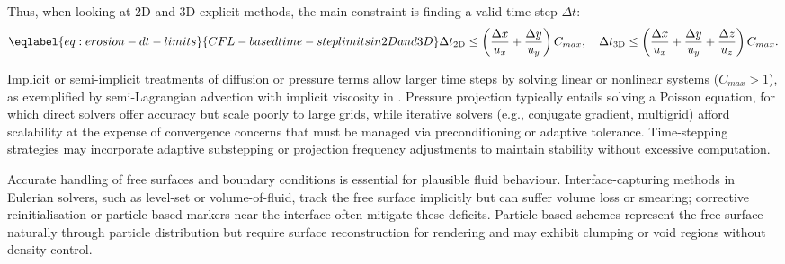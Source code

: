 
Thus, when looking at 2D and 3D explicit methods, the main constraint is finding a valid time-step $\Delta t$:
\begin{align}
    \eqlabel{eq:erosion-dt-limits}{CFL-based time-step limits in 2D and 3D}
    \Delta t_{\text{2D}} \leq \left( \frac{\Delta x}{u_x} + \frac{\Delta y}{u_y} \right) C_{max},
    \quad
    \Delta t_{\text{3D}} \leq \left( \frac{\Delta x}{u_x} + \frac{\Delta y}{u_y} + \frac{\Delta z}{u_z} \right) C_{max}.
\end{align}

Implicit or semi-implicit treatments of diffusion or pressure terms allow larger time steps by solving linear or nonlinear systems ($C_{max} > 1$), as exemplified by semi-Lagrangian advection with implicit viscosity in \cite{Stam1999}. Pressure projection typically entails solving a Poisson equation, for which direct solvers offer accuracy but scale poorly to large grids, while iterative solvers (e.g., conjugate gradient, multigrid) afford scalability at the expense of convergence concerns that must be managed via preconditioning or adaptive tolerance. Time-stepping strategies may incorporate adaptive substepping or projection frequency adjustments to maintain stability without excessive computation.

Accurate handling of free surfaces and boundary conditions is essential for plausible fluid behaviour. Interface-capturing methods in Eulerian solvers, such as level-set or volume-of-fluid, track the free surface implicitly but can suffer volume loss or smearing; corrective reinitialisation or particle-based markers near the interface often mitigate these deficits. Particle-based schemes represent the free surface naturally through particle distribution but require surface reconstruction for rendering and may exhibit clumping or void regions without density control. 

